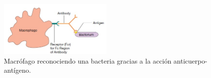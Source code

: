 \begin{figure}[t]
	\centering
	\includegraphics[width=0.5\textwidth]{2_macrofago_anticuerpo}
	\caption{Macrófago reconociendo una bacteria gracias a la acción anticuerpo-antígeno.}
	\label{fig:macrofago_anticuerpo}
\end{figure}


 